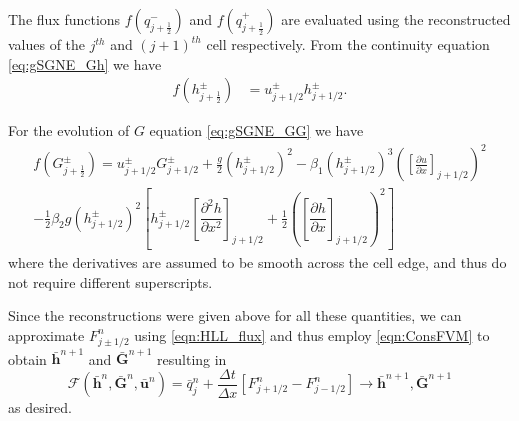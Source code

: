 \documentclass[10pt]{elsarticle}
\newcommand{\vecn}[1]{\boldsymbol{#1}}
\begin{document}
The flux functions $f(q^-_{j+\frac{1}{2}})$ and $f(q^+_{j+\frac{1}{2}})$ are evaluated using the reconstructed values of the $j^{th}$ and $(j+1)^{th}$ cell respectively. From the continuity equation \eqref{eq:gSGNE_Gh} we have
\begin{align*}
f\left(h^\pm_{j+\frac{1}{2}}\right) &= u^\pm_{j + 1/2}  h^\pm_{j + 1/2}.
\end{align*}

For the evolution of $G$ equation \eqref{eq:gSGNE_GG} we have 
\begin{multline}
f\left(G^\pm_{j+\frac{1}{2}}\right) =  u^\pm_{j + 1/2} G^\pm_{j + 1/2}  + \frac{g}{2}\left(h^\pm_{j + 1/2} \right)^2 - \beta_1\left(h^\pm_{j + 1/2}\right)^3 \left(\left[\frac{\partial {u}}{\partial x} \right]_{j + 1/2} \right)^2 \\ - \frac{1}{2} \beta_2 g \left(h^\pm_{j + 1/2}\right)^2  \left[h^\pm_{j + 1/2}\left[\dfrac{\partial^2 h}{\partial x^2} \right]_{j+1/2} + \frac{1}{2}\left(\left[\dfrac{\partial h}{\partial x} \right]_{j+1/2}\right)^2\right]
\end{multline}
where the derivatives are assumed to be smooth across the cell edge, and thus do not require different superscripts.

Since the reconstructions were given above for all these quantities, we can approximate $F^n_{j\pm1/2}$ using \eqref{eqn:HLL_flux} and thus employ \eqref{eqn:ConsFVM} to obtain $\bar{\vecn{h}}^{n+1}$ and $\bar{\vecn{G}}^{n+1}$ resulting in
\begin{equation}
\mathcal{F}\left(\bar{\vecn{h}}^n,\bar{\vecn{G}}^n,\bar{{\vecn{u}}}^n\right) =   \bar{q}^{n}_j  +  \dfrac{\Delta t}{\Delta x}\left[F^n_{j+1/2} - F^n_{j-1/2}\right] \boldsymbol{\rightarrow} \bar{\vecn{h}}^{n+1 },\bar{\vecn{G}}^{n+1}
\label{eq:F_secondord}
\end{equation}
as desired. 
\end{document}
